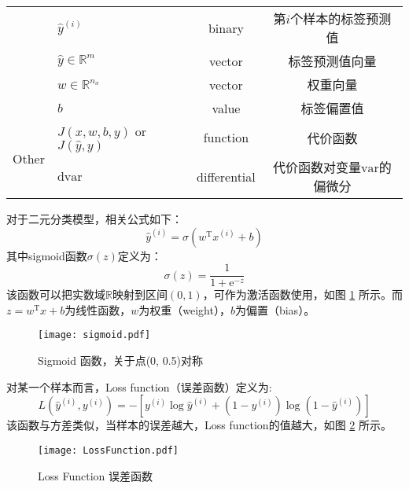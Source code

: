 \begin{table}[htb!]
\begin{threeparttable}
\begin{tabular}{clcc}
                                    & $\hat{y}^{(i)}$                           & binary               & 第$i$个样本的标签预测值                                                  \\
                                    & $\hat{y} \in {\mathbb{R}^{m}}$            & vector               & 标签预测值向量   					                                     \\
                                    & $w \in \mathbb{R}^{n_x}$                  & vector               & 权重向量                                                                \\
                                    & $b$                                       & value                & 标签偏置值                                                            \\ \hline
        \multirow{2}{*}{Other}      & $J(x,w,b,y)$ or $J(\hat{y},y)$            & function             & 代价函数                                                               \\
                                    & $\mathrm{d}\mathrm{var}$                  & differential         & 代价函数对变量$\mathrm{var}$的偏微分                                    \\ \hline
    \end{tabular}
    \label{tab:notations_LR}
    \end{threeparttable}
\end{table}

对于二元分类模型，相关公式如下：
\begin{equation}
    \hat{y}^{(i)} = \sigma(w^\mathrm{T} x^{(i)} + b) \label{eq:logistic}
\end{equation}
其中sigmoid函数$\sigma(z)$定义为：
\begin{equation}
    \sigma(z) = \frac{1}{1 + \mathrm{e}^{-z}} \label{eq:sigmoid}
\end{equation}
该函数可以把实数域$\mathbb{R}$映射到区间$(0, 1)$，可作为激活函数使用，如图 \ref{fig:sigmoid} 所示。而$z = w^\mathrm{T} x + b$为线性函数，$w$为权重（weight），$b$为偏置（bias）。
\begin{figure}[h!b]
    \centering
    \texttt{[image: sigmoid.pdf]}
    \caption{Sigmoid 函数，关于点(0, 0.5)对称}
    \label{fig:sigmoid}
\end{figure}

对某一个样本而言，Loss function（误差函数）定义为:
\begin{equation}
    L(\hat{y}^{(i)}, y^{(i)}) = -\left[y^{(i)} \log \hat{y}^{(i)} + (1 - y^{(i)}) \log (1 - \hat{y}^{(i)})\right] \label{eq:loss}
\end{equation}
该函数与方差类似，当样本的误差越大，Loss function的值越大，如图 \ref{fig:loss} 所示。
\begin{figure}[h!b]
    \centering
    \texttt{[image: LossFunction.pdf]}
    \caption{Loss Function 误差函数}
    \label{fig:loss}
\end{figure}

